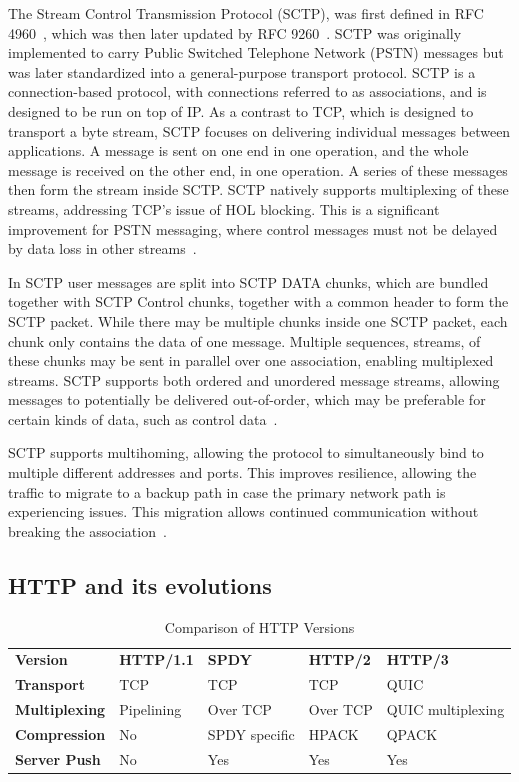 \documentclass[english, 12pt, a4paper, elec, utf8, a-2b, online]{aaltothesis}
\begin{document}
The Stream Control Transmission Protocol (SCTP), was first defined in RFC 4960~\cite{rfc4960},
which was then later updated by RFC 9260~\cite{rfc4960}. SCTP was originally implemented
to carry Public Switched Telephone Network (PSTN) messages but was later standardized
into a general-purpose transport protocol. SCTP is a connection-based protocol, with connections
referred to as associations, and is designed to be run on top of IP. As a contrast
to TCP, which is designed to transport a byte stream, SCTP focuses on delivering individual
messages between applications. A message is sent on one end in one operation, and
the whole message is received on the other end, in one operation. A series of these
messages then form the stream inside SCTP. SCTP natively supports multiplexing of these streams, addressing TCP's issue
of HOL blocking. This is a significant improvement for PSTN messaging, where control
messages must not be delayed by data loss in other streams~\cite{rfc9260}.

In SCTP user messages are split into SCTP DATA chunks, which are bundled together
with SCTP Control chunks, together with a common header to form the SCTP packet. While
there may be multiple chunks inside one SCTP packet, each chunk only contains the data
of one message. Multiple sequences, streams, of these chunks may be sent in parallel
over one association, enabling multiplexed streams. SCTP supports both ordered and
unordered message streams, allowing messages to potentially be delivered out-of-order,
which may be preferable for certain kinds of data, such as control data~\cite{rfc9260}.

SCTP supports multihoming, allowing the protocol to simultaneously bind to multiple
different addresses and ports. This improves resilience, allowing the traffic to migrate
to a backup path in case the primary network path is experiencing issues. This migration
allows continued communication without breaking the association~\cite{rfc9260}.

\subsection{HTTP and its evolutions}

\begin{table}[h]
	\centering
	\caption{Comparison of HTTP Versions}
	\label{tab:http_versions}
	\begin{tabular}{lllll}
	\textbf{Version} & \textbf{HTTP/1.1} & \textbf{SPDY} & \textbf{HTTP/2} & \textbf{HTTP/3} \\
	\textbf{Transport}    & TCP     & TCP & TCP & QUIC    \\
	\textbf{Multiplexing} & Pipelining    & Over TCP & Over TCP & QUIC multiplexing    \\
	\textbf{Compression}  & No    & SPDY specific & HPACK & QPACK    \\
	\textbf{Server Push} & No & Yes & Yes & Yes \\
	\end{tabular}
\end{table}
\end{document}
